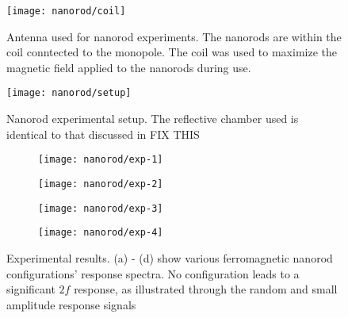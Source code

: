 \begin{figure}[t]
    \centering
    \begin{minipage}[b]{.4\textwidth}
        \centering
        \texttt{[image: nanorod/coil]}
        \caption[Nanorods attached to antenna]{Antenna used for nanorod experiments. The nanorods are within the coil conntected to the monopole. The coil was used to maximize the magnetic field applied to the nanorods during use.}
        \label{fig:nltr-nanorod-coil}
    \end{minipage}
    \hfill
    \begin{minipage}[b]{.4\textwidth}
        \centering
        \texttt{[image: nanorod/setup]}
        \caption[Nanorod experimental setup]{Nanorod experimental setup. The reflective chamber used is identical to that discussed in FIX THIS}
        \label{fig:nltr-nanorod-setup}
    \end{minipage}
\end{figure}


 \begin{figure}
     \centering
     \begin{subfigure}{0.45\textwidth}
         \centering
         \texttt{[image: nanorod/exp-1]}
         \caption[]{}
         \label{fig:nanorod-exp-1}
     \end{subfigure}
         \begin{subfigure}{0.45\textwidth}
         \centering
         \texttt{[image: nanorod/exp-2]}
         \caption[]{}
         \label{fig:nanorod-exp-2}
     \end{subfigure}
         \begin{subfigure}{0.45\textwidth}
         \centering
         \texttt{[image: nanorod/exp-3]}
         \caption[]{}
         \label{fig:nanorod-exp-3}
     \end{subfigure}
         \begin{subfigure}{0.45\textwidth}
         \centering
         \texttt{[image: nanorod/exp-4]}
         \caption[]{}
         \label{fig:nanorod-exp-4}
     \end{subfigure}
     \caption[Ferromagnetic nanorod experimental results]{Experimental results. (a) - (d) show various ferromagnetic nanorod configurations' response spectra. No configuration leads to a significant $2f$ response, as illustrated through the random and small amplitude response signals}
     \label{fig:nanorod-results}
 \end{figure}

